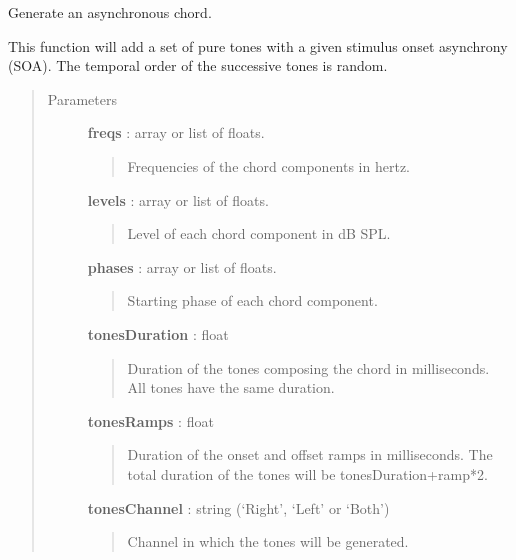 \documentclass[a4paper,12pt,english]{sphinxmanual}
\begin{document}
\begin{fulllineitems}
\end{fulllineitems}


\begin{fulllineitems}
\label{sndlib:sndlib.makeAsynchChord}
Generate an asynchronous chord.

This function will add a set of pure tones with a given
stimulus onset asynchrony (SOA). The temporal order of the
successive tones is random.
\begin{quote}\begin{description}
\item[{Parameters }] \leavevmode
\textbf{freqs} : array or list of floats.
\begin{quote}

Frequencies of the chord components in hertz.
\end{quote}

\textbf{levels} : array or list of floats.
\begin{quote}

Level of each chord component in dB SPL.
\end{quote}

\textbf{phases} : array or list of floats.
\begin{quote}

Starting phase of each chord component.
\end{quote}

\textbf{tonesDuration} : float
\begin{quote}

Duration of the tones composing the chord in milliseconds.
All tones have the same duration.
\end{quote}

\textbf{tonesRamps} : float
\begin{quote}

Duration of the onset and offset ramps in milliseconds.
The total duration of the tones will be tonesDuration+ramp*2.
\end{quote}

\textbf{tonesChannel} : string (`Right', `Left' or `Both')
\begin{quote}

Channel in which the tones will be generated.
\end{quote}


\end{description}
\end{quote}
\end{fulllineitems}
\end{document}

